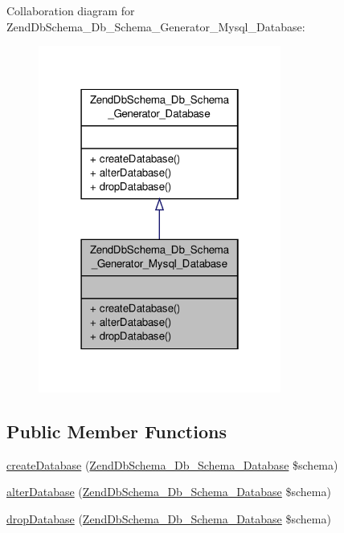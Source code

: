 Collaboration diagram for Zend\-Db\-Schema\-\_\-\-Db\-\_\-\-Schema\-\_\-\-Generator\-\_\-\-Mysql\-\_\-\-Database\-:\nopagebreak
\begin{figure}[H]
\begin{center}
\leavevmode
\includegraphics[width=226pt]{classZendDbSchema__Db__Schema__Generator__Mysql__Database__coll__graph}
\end{center}
\end{figure}
\subsection*{Public Member Functions}
\begin{DoxyCompactItemize}
\item 
\hyperlink{classZendDbSchema__Db__Schema__Generator__Mysql__Database_a8d037ca19f7ac5d045fe2d9babe004c6}{create\-Database} (\hyperlink{classZendDbSchema__Db__Schema__Database}{Zend\-Db\-Schema\-\_\-\-Db\-\_\-\-Schema\-\_\-\-Database} \$schema)
\item 
\hyperlink{classZendDbSchema__Db__Schema__Generator__Mysql__Database_a98cc5d4cbab5e5c8b32d7b02fa9cb0dc}{alter\-Database} (\hyperlink{classZendDbSchema__Db__Schema__Database}{Zend\-Db\-Schema\-\_\-\-Db\-\_\-\-Schema\-\_\-\-Database} \$schema)
\item 
\hyperlink{classZendDbSchema__Db__Schema__Generator__Mysql__Database_a94a1d9e8d2eaa3740bd9b62cc3a8973e}{drop\-Database} (\hyperlink{classZendDbSchema__Db__Schema__Database}{Zend\-Db\-Schema\-\_\-\-Db\-\_\-\-Schema\-\_\-\-Database} \$schema)
\end{DoxyCompactItemize}



